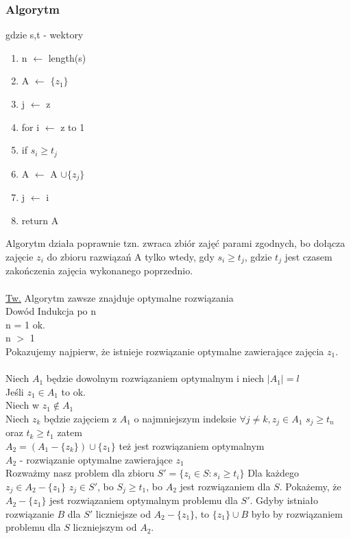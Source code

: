 \subsubsection{Algorytm}
gdzie s,t - wektory
\begin{enumerate}
	\item n $\leftarrow$ length(s)
    \item A $\leftarrow$ $\lbrace z_1 \rbrace$
    \item j $\leftarrow$ z
    \item for i $\leftarrow$ z to 1
    \item \tab if $s_i \geq t_j$ 
    \item \tab \tab A $\leftarrow$ A $\cup \lbrace z_j \rbrace$
    \item \tab \tab j $\leftarrow$ i
    \item return A
\end{enumerate}
Algorytm działa poprawnie tzn. zwraca zbiór zajęć parami zgodnych, bo dołącza zajęcie $z_i$ do zbioru razwiązań A tylko wtedy, gdy $s_i \geq t_j$, gdzie $t_j$ jest czasem zakończenia zajęcia wykonanego poprzednio.\\
\\
\underline{Tw.} Algorytm zawsze znajduje optymalne rozwiązania\\
Dowód Indukcja po n\\
\tab n = 1 ok.\\
\tab n $>$ 1\\
Pokazujemy najpierw, że istnieje rozwiązanie optymalne zawierające zajęcia $z_1$.\\
\\
Niech $A_1$ będzie dowolnym rozwiązaniem optymalnym i niech $\vert A_1\vert = l$\\
Jeśli $z_1 \in A_1$ to ok. \\
Niech w $z_1 \not\in A_1$ \\
Niech $z_k$ będzie zajęciem z $A_1$ o najmniejszym indeksie $\forall{j} \neq k, z_j \in A_1$ $s_j \geq t_n$ oraz $t_k \geq t_1$ zatem \\
$A_2 = (A_1 - \lbrace z_k\rbrace ) \cup \lbrace z_1 \rbrace $ też jest rozwiązaniem optymalnym \\
$A_2$ - rozwiązanie optymalne zawierające $z_1$\\
Rozważmy nasz problem dla zbioru $S' = \lbrace z_i \in S: s_i \geq t_i \rbrace$ Dla każdego $z_j \in A_2 - \lbrace z_1 \rbrace$ $z_j \in S'$, bo $S_j \geq t_1$, bo $A_2$ jest rozwiązaniem dla $S$. Pokażemy, że $A_2 - \lbrace z_1 \rbrace$ jest rozwiązaniem optymalnym problemu dla $S'$. Gdyby istniało rozwiązanie $B$ dla $S'$ liczniejsze od $A_2 - \lbrace z_1 \rbrace$, to $\lbrace z_1 \rbrace \cup B$ było by rozwiązaniem problemu dla $S$ liczniejszym od $A_2$. \\
